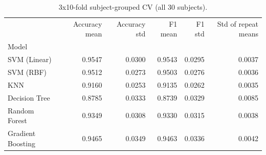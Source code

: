 \begin{table}
\caption{3x10-fold subject-grouped CV (all 30 subjects).}
\label{tab:Ext07_repeated_cv_summary}
\begin{tabular}{lrrrrr}
\toprule
 & Accuracy mean & Accuracy std & F1 mean & F1 std & Std of repeat means \\
Model &  &  &  &  &  \\
\midrule
SVM (Linear) & 0.9547 & 0.0300 & 0.9543 & 0.0295 & 0.0037 \\
SVM (RBF) & 0.9512 & 0.0273 & 0.9503 & 0.0276 & 0.0036 \\
KNN & 0.9160 & 0.0253 & 0.9135 & 0.0262 & 0.0035 \\
Decision Tree & 0.8785 & 0.0333 & 0.8739 & 0.0329 & 0.0085 \\
Random Forest & 0.9349 & 0.0308 & 0.9330 & 0.0315 & 0.0038 \\
Gradient Boosting & 0.9465 & 0.0349 & 0.9463 & 0.0336 & 0.0042 \\
\bottomrule
\end{tabular}
\end{table}
